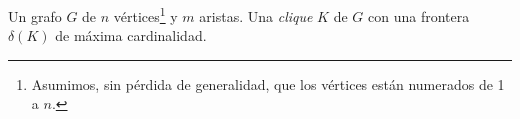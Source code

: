 \begin{pseudocodigo}
    \Require Un grafo $G$ de $n$ v\'ertices\footnote{Asumimos, sin p\'erdida 
        de generalidad, que los v\'ertices est\'an numerados de 1 a $n$.}
        y $m$ aristas.
    \Ensure Una \emph{clique} $K$ de $G$ con una frontera 
        $\delta(K)$ de m\'axima cardinalidad.
    \Statex

    \State {}
\end{pseudocodigo}

